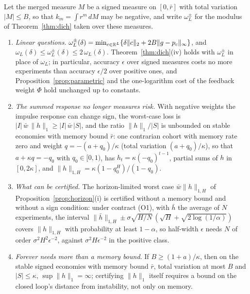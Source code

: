 \begin{proposition}\label{prop:signed}
Let the merged measure $M$ be a signed measure on $[0,\bar r]$ with total variation $|M|\le B$, so that $k_m=\int r^m\,dM$ may be negative, and write $\omega^{\pm}_L$ for the modulus of Theorem~\ref{thm:dich} taken over these measures.
\begin{enumerate}[label=(\roman*)]
\item \emph{Linear questions.} $\omega^{\pm}_L(\delta)=\min_{c\in\mathbb{R}^L}\{\delta\|c\|_2+2B\|g-p_c\|_\infty\}$, and $\omega_L(\delta)\le\omega^{\pm}_L(\delta)\le2\,\omega_L(\delta)$. Theorem~\ref{thm:dich}(iv) holds with $\omega^\pm_L$ in place of $\omega_L$; in particular, accuracy $\epsilon$ over signed measures costs no more experiments than accuracy $\epsilon/2$ over positive ones, and Proposition~\ref{prop:parametric} and the one-logarithm cost of the feedback weight $\Phi$ hold unchanged up to constants.
\item \emph{The summed response no longer measures risk.} With negative weights the impulse response can change sign, the worst-case loss is $|I|\,\bar w\,\|h\|_1\ge|I|\,\bar w\,|S|$, and the ratio $\|h\|_1/|S|$ is unbounded on stable economies with memory bound $\bar r$: one contrarian cohort with memory rate zero and weight $q=-(a+q_0)/\kappa$ (total variation $(a+q_0)/\kappa$), so that $a+\kappa q=-q_0$ with $q_0\in[0,1)$, has $h_t=\kappa(-q_0)^{t-1}$, partial sums of $h$ in $[0,2\kappa]$, and $\|h\|_{1,H}=\kappa(1-q_0^H)/(1-q_0)$.
\item \emph{What can be certified.} The horizon-limited worst case $\bar w\|h\|_{1,H}$ of Proposition~\ref{prop:horizon}(i) is certified without a memory bound and without a sign condition: under contract (O1), with $\bar h$ the average of $N$ experiments, the interval $\|\bar h\|_{1,H}\pm\sigma\sqrt{H/N}\,(\sqrt H+\sqrt{2\log(1/\alpha)})$ covers $\|h\|_{1,H}$ with probability at least $1-\alpha$, so half-width $\epsilon$ needs $N$ of order $\sigma^2H^2\epsilon^{-2}$, against $\sigma^2H\epsilon^{-2}$ in the positive class.
\item \emph{Forever needs more than a memory bound.} If $B\ge(1+a)/\kappa$, then on the stable signed economies with memory bound $\bar r$, total variation at most $B$ and $|S|\le\kappa$, $\sup\|h\|_1=\infty$; certifying $\|h\|_1$ itself requires a bound on the closed loop's distance from instability, not only on memory.
\end{enumerate}
\hfill\Proved
\end{proposition}

